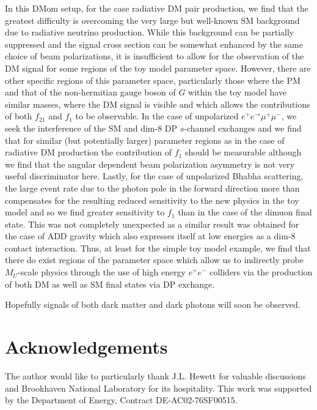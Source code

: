 \documentclass[14pt]{article}
\def\to{\rightarrow}
\begin{document}
{In this DMom setup, for the case radiative DM pair production, we find that the greatest difficulty is overcoming the very large but well-known SM background due to radiative neutrino production. While 
this background can be partially suppressed and the signal cross section can be somewhat enhanced by the same choice of beam polarizations, it is insufficient to allow for the observation of the DM signal 
for some regions of the toy model parameter space. However, there are other specific regions of this parameter space, particularly those where the PM and that of the non-hermitian gauge boson 
of $G$ within the toy model have similar masses, where the DM signal is visible and which allows the contributions of both $f_{21}$ and $f_1$ to be observable. In the case of unpolarized 
$e^+e^\to \mu^+\mu^-$, we seek the interference of the SM and dim-8 DP $s$-channel exchanges and we find that for similar (but potentially larger) parameter regions as in the case of radiative 
DM production the contribution of $f_1$ should be measurable although we find that the angular dependent beam polarization asymmetry is not very useful discriminator here. Lastly, for the case 
of unpolarized Bhabha scattering, the large event rate due to the photon pole in the forward direction more than compensates for the resulting reduced sensitivity to the new physics in the toy model and 
so we find greater sensitivity to $f_1$ than in the case of the dimuon final state. This was not completely unexpected as a similar result was obtained for the case of ADD gravity which also expresses 
itself at low energies as a dim-8 contact interaction. Thus, at least for the simple toy model example, we find that there do exist regions of the parameter space which allow us to indirectly probe 
$M_U$-scale physics through the use of high energy $e^+e^-$ colliders via the production of both DM as well as SM final states via DP exchange.


Hopefully signals of both dark matter and dark photons will soon be observed.


\section*{Acknowledgements}
%
The author would like to particularly thank J.L. Hewett for valuable discussions and Brookhaven National Laboratory for its hospitality.  This work was supported by the Department of Energy, Contract 
DE-AC02-76SF00515.




}
\end{document}
